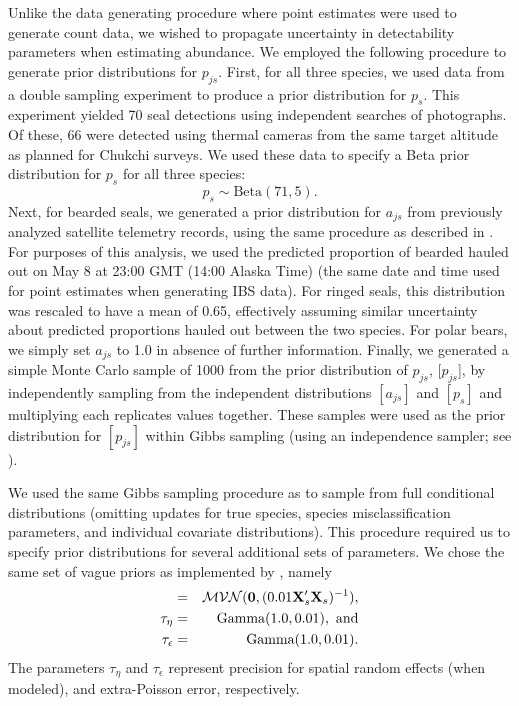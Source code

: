 \documentclass[]{rsos}%
\begin{document}
{Unlike the data generating procedure where point estimates were used to generate count data, we wished to propagate uncertainty in detectability parameters when estimating abundance.  We employed the following procedure to generate prior distributions for $p_{js}$.  First, for all three species, we used data from a double sampling experiment \cite{ConnEtAl2014} to produce a prior distribution for $p_s$.  This experiment yielded 70 seal detections using independent searches of photographs. Of these, 66 were detected using thermal cameras from the same target altitude as planned for Chukchi surveys.  We used these data to specify a Beta prior distribution for $p_s$ for all three species:
\begin{equation*}
  p_s \sim \text{Beta}(71,5).
\end{equation*}
Next, for bearded seals, we generated a prior distribution for $a_{js}$ from previously analyzed satellite telemetry records, using the same procedure as described in \cite{ConnEtAl2014}.  For purposes of this analysis, we used the predicted proportion of bearded hauled out on May 8 at 23:00 GMT (14:00 Alaska Time) (the same date and time used for point estimates when generating IBS data).  For ringed seals, this distribution was rescaled to have a mean of 0.65, effectively assuming similar uncertainty about predicted proportions hauled out between the two species.  For polar bears, we simply set $a_{js}$ to 1.0 in absence of further information.  Finally, we generated a simple Monte Carlo sample of 1000 from the prior distribution of $p_{js}$, [$p_{js}$], by independently sampling from the independent distributions $[a_{js}]$ and $[p_s]$ and multiplying each replicates values together.  These samples were used as the prior distribution for $[p_{js}]$ within Gibbs sampling (using an independence sampler; see \cite{Givens2005}).

We used the same Gibbs sampling procedure as \cite{ConnEtAl2014} to sample from full conditional distributions (omitting updates for true species, species misclassification parameters, and individual covariate distributions).  This procedure required us to specify prior distributions for several additional sets of parameters.  We chose the same set of vague priors as implemented by \cite{ConnEtAl2014}, namely
\begin{eqnarray*}
  [\boldsymbol{\beta}_s] & = & \mathcal{MVN}({\bf 0},(0.01 {\bf X}_s^\prime {\bf X}_s)^{-1}), \\
  \tau_\eta  & = &  \text{Gamma}(1.0,0.01), \text{ and} \\
  \tau_\epsilon & = & \text{Gamma}(1.0,0.01).
\end{eqnarray*}
The parameters $\tau_\eta$ and $\tau_\epsilon$ represent precision for spatial random effects (when modeled), and extra-Poisson error, respectively.

}
\end{document}
